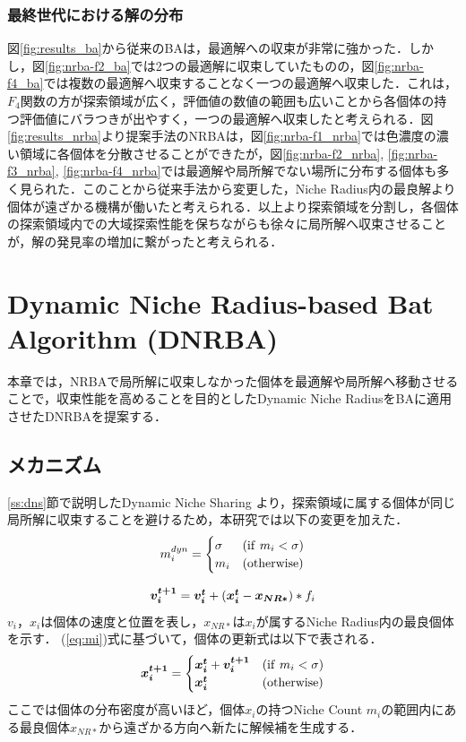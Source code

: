 \documentclass[a4j,11pt]{jarticle}
\begin{document}
\subsubsection{最終世代における解の分布}
\label{sss:dstr_sol} 
図\ref{fig:results_ba}から従来のBAは，最適解への収束が非常に強かった．しかし，図\ref{fig:nrba-f2_ba}では2つの最適解に収束していたものの，図\ref{fig:nrba-f4_ba}では複数の最適解へ収束することなく一つの最適解へ収束した．これは，$F_4$関数の方が探索領域が広く，評価値の数値の範囲も広いことから各個体の持つ評価値にバラつきが出やすく，一つの最適解へ収束したと考えられる．図\ref{fig:results_nrba}より提案手法のNRBAは，図\ref{fig:nrba-f1_nrba}では色濃度の濃い領域に各個体を分散させることができたが，図\ref{fig:nrba-f2_nrba}, \ref{fig:nrba-f3_nrba}, \ref{fig:nrba-f4_nrba}では最適解や局所解でない場所に分布する個体も多く見られた．このことから従来手法から変更した，Niche Radius内の最良解より個体が遠ざかる機構が働いたと考えられる．以上より探索領域を分割し，各個体の探索領域内での大域探索性能を保ちながらも徐々に局所解へ収束させることが，解の発見率の増加に繋がったと考えられる．


\clearpage
\newpage
\section{Dynamic Niche Radius-based Bat Algorithm (DNRBA)}
\label{sec:DNRBA}
本章では，NRBAで局所解に収束しなかった個体を最適解や局所解へ移動させることで，収束性能を高めることを目的としたDynamic Niche RadiusをBAに適用させたDNRBAを提案する．
\subsection{メカニズム}
\label{ss:DNRBA-abst}
\ref{ss:dns}節で説明したDynamic Niche Sharing \cite{DNS} より，探索領域に属する個体が同じ局所解に収束することを避けるため，本研究では以下の変更を加えた．
\begin{equation}
\label{eq:mi}
m_i^{dyn}=\begin{cases}
\sigma & ({\rm if } \ m_i < \sigma) \\
m_i & ({\rm otherwise})
\end{cases}
\end{equation}

\begin{equation}
\label{eq:dnrba-vi}
 \mbox{\boldmath $v_i^{t+1}$} = \mbox{\boldmath $v_i^t$} + (\mbox{\boldmath $x_i^t$}-\mbox{\boldmath $x_{NR*}$})*f_i
\end{equation}
$v_i$，$x_i$は個体の速度と位置を表し，$x_{NR*}$は$x_i$が属するNiche Radius内の最良個体を示す．
(\ref{eq:mi})式に基づいて，個体の更新式は以下で表される．
\begin{equation}
\label{eq:dnrba-xi}
\mbox{\boldmath $x_i^{t+1}$}=\begin{cases}
\mbox{\boldmath $x_i^t$}+\mbox{\boldmath $v_i^{t+1}$} & ({\rm if} \ m_i < \sigma) \\
\mbox{\boldmath $x_i^t$} & ({\rm otherwise})
\end{cases}
\end{equation}
ここでは個体の分布密度が高いほど，個体$x_i$の持つNiche Count $m_i$の範囲内にある最良個体$x_{NR*}$から遠ざかる方向へ新たに解候補を生成する．
\end{document}
